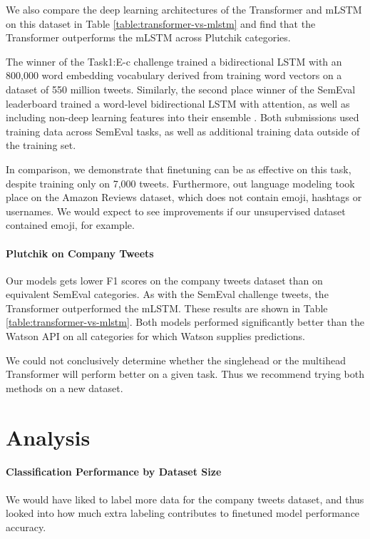 \documentclass[letterpaper]{article} \usepackage{aaai19}  \usepackage{times}  \usepackage{helvet}  \usepackage{courier}  \usepackage{url}  \usepackage{graphicx}  \usepackage{booktabs}
\begin{document}
We also compare the deep learning architectures of the Transformer and mLSTM on this dataset in Table \ref{table:transformer-vs-mlstm} and find that the Transformer outperforms the mLSTM across Plutchik categories.

The winner of the Task1:E-c challenge \cite{WinnerSemEval2018Task1} trained a bidirectional LSTM with an 800,000 word embedding vocabulary derived from training word vectors \cite{Mikolov2013} on a dataset of 550 million tweets. Similarly, the second place winner of the SemEval leaderboard trained a word-level bidirectional LSTM with attention, as well as including non-deep learning features into their ensemble \cite{ThirdPlaceSemEval2018Task1}. Both submissions used training data across SemEval tasks, as well as additional training data outside of the training set.

In comparison, we demonstrate that finetuning can be as effective on this task, despite training only on 7,000 tweets. Furthermore, out language modeling took place on the Amazon Reviews dataset, which does not contain emoji, hashtags or usernames. We would expect to see improvements if our unsupervised dataset contained emoji, for example.


\paragraph{Plutchik on Company Tweets}
Our models gets lower F1 scores on  the company tweets dataset than on equivalent SemEval categories. 
As with the SemEval challenge tweets, the Transformer outperformed the mLSTM. These results are shown in Table \ref{table:transformer-vs-mlstm}. Both models performed significantly better than the Watson API on all categories for which Watson supplies predictions.

We could not conclusively determine whether the singlehead or the multihead Transformer will perform better on a given task. Thus we recommend trying both methods on a new dataset.


\section{Analysis}

\paragraph{Classification Performance by Dataset Size}
We would have liked to label more data for the company tweets dataset, and thus looked into how much extra labeling contributes to finetuned model performance accuracy. 
\end{document}
